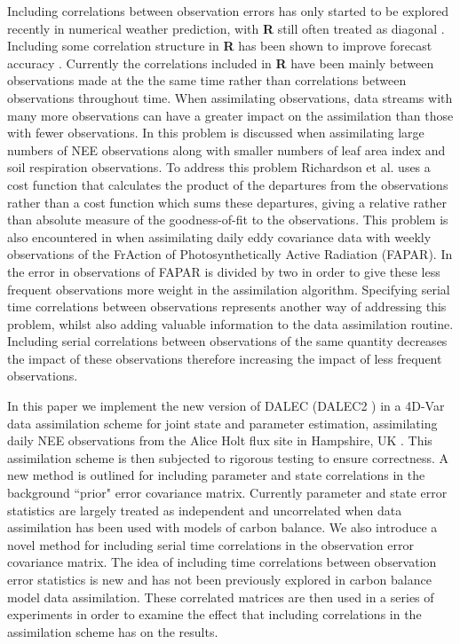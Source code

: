 Including correlations between observation errors has only started to be explored recently in numerical weather prediction, with \textbf{R} still often treated as diagonal \citep{Stewart2013}. Including some correlation structure in \textbf{R} has been shown to improve forecast accuracy \citep{weston2014accounting}. Currently the correlations included in \textbf{R} have been mainly between observations made at the the same time rather than correlations between observations throughout time. When assimilating observations, data streams with many more observations can have a greater impact on the assimilation than those with fewer observations. In \citet{richardson2010estimating} this problem is discussed when assimilating large numbers of NEE observations along with smaller numbers of leaf area index and soil respiration observations. To address this problem Richardson et al. uses a cost function that calculates the product of the departures from the observations rather than a cost function which sums these departures, giving a relative rather than absolute measure of the goodness-of-fit to the observations. This problem is also encountered in \citet{Bacour2015} when assimilating daily eddy covariance data with weekly observations of the FrAction of Photosynthetically Active Radiation (FAPAR). In \citet{Bacour2015} the error in observations of FAPAR is divided by two in order to give these less frequent observations more weight in the assimilation algorithm. Specifying serial time correlations between observations represents another way of addressing this problem, whilst also adding valuable information to the data assimilation routine. Including serial correlations between observations of the same quantity decreases the impact of these observations \citep{jarvinen1999variational} therefore increasing the impact of less frequent observations. 

In this paper we implement the new version of DALEC (DALEC2 \citep{Bloom2015}) in a 4D-Var data assimilation scheme for joint state and parameter estimation, assimilating daily NEE observations from the Alice Holt flux site in Hampshire, UK \citep{wilkinson2012inter}. This assimilation scheme is then subjected to rigorous testing to ensure correctness. A new method is outlined for including parameter and state correlations in the background ``prior" error covariance matrix. Currently parameter and state error statistics are largely treated as independent and uncorrelated when data assimilation has been used with models of carbon balance. We also introduce a novel method for including serial time correlations in the observation error covariance matrix. The idea of including time correlations between observation error statistics is new and has not been previously explored in carbon balance model data assimilation. These correlated matrices are then used in a series of experiments in order to examine the effect that including correlations in the assimilation scheme has on the results.


